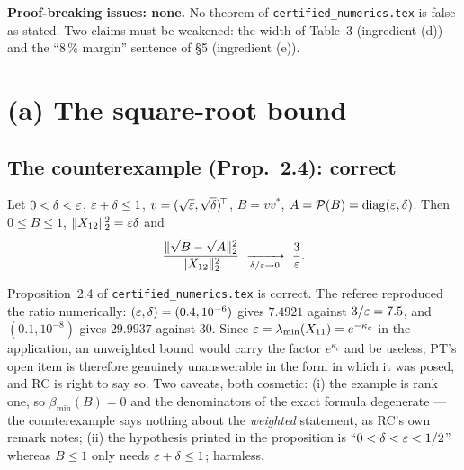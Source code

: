 \documentclass[11pt]{article}
\begin{document}
\medskip\noindent\textbf{Proof-breaking issues: none.}  No theorem of
\texttt{certified\_numerics.tex} is false as stated.  Two claims must be weakened: the width of
Table~3 (ingredient (d)) and the ``$8\,\%$ margin'' sentence of \S5 (ingredient (e)).

\section{(a) The square-root bound}\label{sec:a}

\subsection{The counterexample (Prop.~2.4): correct}

\begin{lemma}\label{lem:cex}
Let $0<\delta<\varepsilon$, $\varepsilon+\delta\le1$, $v=(\sqrt{\varepsilon},\sqrt\delta)^{\!\top}$, $B=vv^*$,
$A=\mathcal P(B)=\mathrm{diag}(\varepsilon,\delta)$.  Then $0\le B\le1$, $\|X_{12}\|_2^2=\varepsilon\delta$ and
\[
 \frac{\|\sqrt B-\sqrt A\|_2^2}{\|X_{12}\|_2^2}\ \xrightarrow[\delta/\eps\to0]{}\ \frac3\eps .
\]
\end{lemma}

\begin{verdictok}
Proposition~2.4 of \texttt{certified\_numerics.tex} is correct.  The referee reproduced the ratio
numerically: $(\varepsilon,\delta)=(0.4,10^{-6})$ gives $7.4921$ against $3/\varepsilon=7.5$, and
$(0.1,10^{-8})$ gives $29.9937$ against $30$.  Since $\varepsilon=\lambda_{\min}(X_{11})=e^{-\kappa_c}$ in
the application, an unweighted bound would carry the factor $e^{\kappa_c}$ and be useless; PT's open
item is therefore genuinely unanswerable in the form in which it was posed, and RC is right to say
so.  Two caveats, both cosmetic: (i) the example is rank one, so $\beta_{\min}(B)=0$ and the
denominators of the exact formula degenerate --- the counterexample says nothing about the
\emph{weighted} statement, as RC's own remark notes; (ii) the hypothesis printed in the proposition
is ``$0<\delta<\varepsilon<1/2$'' whereas $B\le1$ only needs $\varepsilon+\delta\le1$; harmless.
\end{verdictok}
\end{document}
